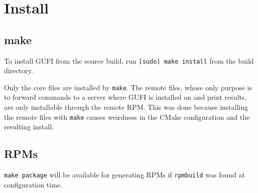 \section{Install}
\subsection{make}
To install GUFI from the source build, run \texttt{[sudo] make
  install} from the build directory.

Only the core files are installed by \texttt{make}. The remote files,
whose only purpose is to forward commands to a server where GUFI is
installed on and print results, are only installable through the
remote RPM. This was done because installing the remote files with
\texttt{make} causes weirdness in the CMake configuration and the
resulting install.

\subsection{RPMs}
\texttt{make package} will be available for generating RPMs if
\texttt{rpmbuild} was found at configuration time.
